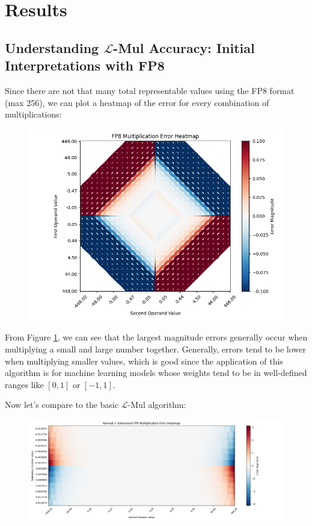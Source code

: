 \documentclass[12pt,letterpaper]{article}
\newcommand{\lmul}{$\mathcal{L}$-Mul\xspace}
\begin{document}
\section{Results}

\begin{table}[htbp]
    \caption{BF16 \lmul Basic Analysis}
    \label{tab:bf16_lmul}
    \resizebox{1\linewidth}{!}{}
\end{table}

\subsection{Understanding \lmul Accuracy: Initial Interpretations with FP8}

Since there are not that many total representable values using the FP8 format (max 256), we can plot a heatmap of the error for every combination of multiplications:
\pagebreak
\begin{figure}[htbp]
    \centering
    \includegraphics[width=.65\linewidth]{q1_checkpoint/fp8_multiplication_error.png}
    \label{fig:fp8_multiplication_error}
\end{figure}

From Figure \ref{fig:fp8_multiplication_error}, we can see that the largest magnitude errors generally occur when multiplying a small and large number together. Generally, errors tend to be lower when multiplying smaller values, which is good since the application of this algorithm is for machine learning models whose weights tend to be in well-defined ranges like $[0,1]$ or $[-1,1]$.

Now let's compare to the basic \lmul algorithm:

\begin{figure}[htbp]
    \centering
    \includegraphics[width=\linewidth]{q1_checkpoint/basic_lmul_normalxsubnormal.png}
    \label{fig:basic_lmul_normalxsubnormal}
\end{figure}
\end{document}
